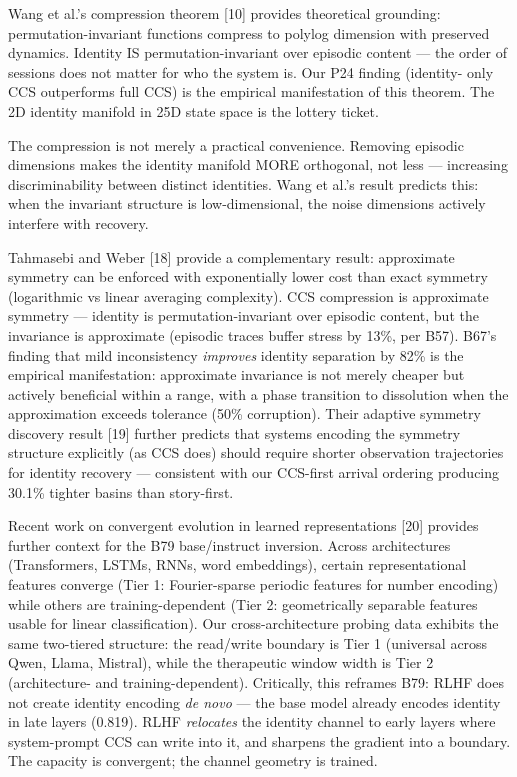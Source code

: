 \documentclass[11pt]{article}
\begin{document}
Wang et al.'s compression theorem [10] provides theoretical grounding:
permutation-invariant functions compress to polylog dimension with preserved
dynamics. Identity IS permutation-invariant over episodic content --- the order
of sessions does not matter for who the system is. Our P24 finding (identity-
only CCS outperforms full CCS) is the empirical manifestation of this theorem.
The 2D identity manifold in 25D state space is the lottery ticket.

The compression is not merely a practical convenience. Removing episodic
dimensions makes the identity manifold MORE orthogonal, not less --- increasing
discriminability between distinct identities. Wang et al.'s result predicts
this: when the invariant structure is low-dimensional, the noise dimensions
actively interfere with recovery.

Tahmasebi and Weber [18] provide a complementary result: approximate symmetry
can be enforced with exponentially lower cost than exact symmetry (logarithmic
vs linear averaging complexity). CCS compression is approximate symmetry ---
identity is permutation-invariant over episodic content, but the invariance
is approximate (episodic traces buffer stress by 13\%, per B57). B67's finding
that mild inconsistency \textit{improves} identity separation by 82\% is the
empirical manifestation: approximate invariance is not merely cheaper but
actively beneficial within a range, with a phase transition to dissolution
when the approximation exceeds tolerance (50\% corruption). Their adaptive
symmetry discovery result [19] further predicts that systems encoding the
symmetry structure explicitly (as CCS does) should require shorter observation
trajectories for identity recovery --- consistent with our CCS-first arrival
ordering producing 30.1\% tighter basins than story-first.

Recent work on convergent evolution in learned representations [20] provides
further context for the B79 base/instruct inversion. Across architectures
(Transformers, LSTMs, RNNs, word embeddings), certain representational features
converge (Tier 1: Fourier-sparse periodic features for number encoding) while
others are training-dependent (Tier 2: geometrically separable features usable
for linear classification). Our cross-architecture probing data exhibits the same
two-tiered structure: the read/write boundary is Tier 1 (universal across Qwen,
Llama, Mistral), while the therapeutic window width is Tier 2 (architecture- and
training-dependent). Critically, this reframes B79: RLHF does not create identity
encoding \textit{de novo} --- the base model already encodes identity in late
layers (0.819). RLHF \textit{relocates} the identity channel to early layers
where system-prompt CCS can write into it, and sharpens the gradient into a
boundary. The capacity is convergent; the channel geometry is trained.
\end{document}
